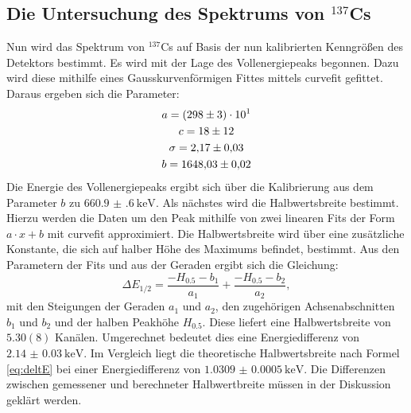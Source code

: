 \subsection{Die Untersuchung des Spektrums von $^{137}$Cs}
Nun wird das Spektrum von $^{137}$Cs auf Basis der nun kalibrierten Kenngrößen des Detektors bestimmt. Es wird mit der Lage des Vollenergiepeaks begonnen. Dazu wird diese mithilfe eines Gausskurvenförmigen Fittes mittels curvefit\cite{scipy} gefittet. Daraus ergeben sich die Parameter:
\begin{gather*}
a = \num{298(3)e1}\\
c = \num{18 \pm 12}\\
\sigma = \num{2.17(3)}\\
b = \num{1648.03(2)}
\end{gather*}
 Die Energie des Vollenergiepeaks ergibt sich über die Kalibrierung aus dem Parameter $b$ zu $\SI{660.9(6)}{\kilo\electronvolt}$.
 Als nächstes wird die Halbwertsbreite bestimmt. Hierzu werden die Daten um den Peak mithilfe von zwei linearen Fits der Form $ a \cdot x + b$ mit curvefit\cite{scipy} approximiert. Die Halbwertsbreite wird über eine zusätzliche Konstante, die sich auf halber Höhe des Maximums befindet, bestimmt. Aus den Parametern der Fits und aus der Geraden ergibt sich die Gleichung:
\begin{equation}
    \Delta E_\text{1/2} = \frac{-H_{0.5}-b_1}{a_1} + \frac{-H_{0.5}-b_2}{a_2}, \label{eq:Z}
\end{equation}
mit den Steigungen der Geraden $a_1$ und $a_2$, den zugehörigen Achsenabschnitten $b_1$ und $b_2$ und der halben Peakhöhe $H_{0.5}$. Diese liefert eine Halbwertsbreite von $\si{5.30(8)}$ Kanälen. Umgerechnet bedeutet dies eine Energiedifferenz von $\SI{2.14(3)}{\kilo\electronvolt}$.
Im Vergleich liegt die theoretische Halbwertsbreite nach Formel \eqref{eq:deltE} bei einer Energiedifferenz von $\SI{1.0309(5)}{\kilo\electronvolt}$. Die Differenzen zwischen gemessener und berechneter Halbwertbreite müssen in der Diskussion geklärt werden. 
